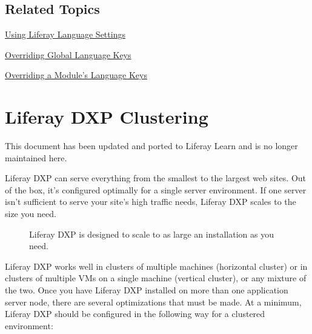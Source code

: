 \section{Related Topics}\label{related-topics}

\href{/docs/7-2/frameworks/-/knowledge_base/f/using-liferays-localization-settings}{Using
Liferay Language Settings}

\href{/docs/7-2/customization/-/knowledge_base/c/overriding-global-language-keys}{Overriding
Global Language Keys}

\href{/docs/7-2/customization/-/knowledge_base/c/overriding-a-modules-language-keys}{Overriding
a Module's Language Keys}

\chapter{Liferay DXP Clustering}\label{liferay-dxp-clustering}

{This document has been updated and ported to Liferay Learn and is no
longer maintained here.}

Liferay DXP can serve everything from the smallest to the largest web
sites. Out of the box, it's configured optimally for a single server
environment. If one server isn't sufficient to serve your site's high
traffic needs, Liferay DXP scales to the size you need.

\begin{figure}
\centering
{}
\caption{Liferay DXP is designed to scale to as large an installation as
you need.}
\end{figure}

Liferay DXP works well in clusters of multiple machines (horizontal
cluster) or in clusters of multiple VMs on a single machine (vertical
cluster), or any mixture of the two. Once you have Liferay DXP installed
on more than one application server node, there are several
optimizations that must be made. At a minimum, Liferay DXP should be
configured in the following way for a clustered environment:

